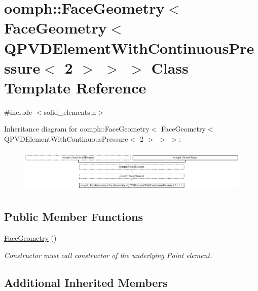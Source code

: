 \hypertarget{classoomph_1_1FaceGeometry_3_01FaceGeometry_3_01QPVDElementWithContinuousPressure_3_012_01_4_01_4_01_4}{}\section{oomph\+:\+:Face\+Geometry$<$ Face\+Geometry$<$ Q\+P\+V\+D\+Element\+With\+Continuous\+Pressure$<$ 2 $>$ $>$ $>$ Class Template Reference}
\label{classoomph_1_1FaceGeometry_3_01FaceGeometry_3_01QPVDElementWithContinuousPressure_3_012_01_4_01_4_01_4}


{\ttfamily \#include $<$solid\+\_\+elements.\+h$>$}

Inheritance diagram for oomph\+:\+:Face\+Geometry$<$ Face\+Geometry$<$ Q\+P\+V\+D\+Element\+With\+Continuous\+Pressure$<$ 2 $>$ $>$ $>$\+:\begin{figure}[H]
\begin{center}
\leavevmode
\includegraphics[height=2.129278cm]{classoomph_1_1FaceGeometry_3_01FaceGeometry_3_01QPVDElementWithContinuousPressure_3_012_01_4_01_4_01_4}
\end{center}
\end{figure}
\subsection*{Public Member Functions}
\begin{DoxyCompactItemize}
\item 
\hyperlink{classoomph_1_1FaceGeometry_3_01FaceGeometry_3_01QPVDElementWithContinuousPressure_3_012_01_4_01_4_01_4_a21abe926021d8f282853ea03ddb09a38}{Face\+Geometry} ()
\begin{DoxyCompactList}\small\item\em Constructor must call constructor of the underlying Point element. \end{DoxyCompactList}\end{DoxyCompactItemize}
\subsection*{Additional Inherited Members}


